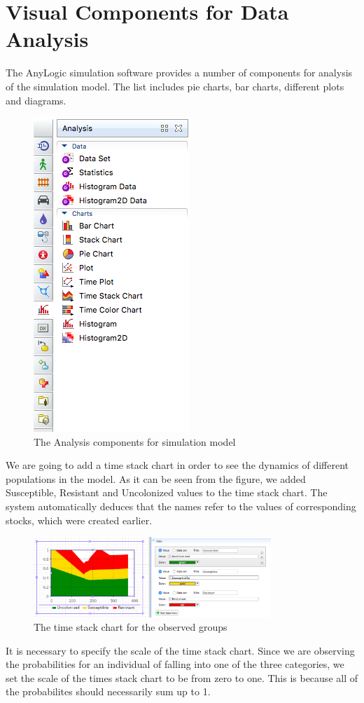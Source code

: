 \section{Visual Components for Data Analysis}

The AnyLogic simulation software provides a number of components for analysis of the simulation model. The list includes pie charts, bar charts, different plots and diagrams.

\begin{figure}[H]
  \centering
  \includegraphics[height=0.5\textwidth]{img/screens/charts/charts1}
  \caption{The Analysis components for simulation model}
\end{figure}

We are going to add a time stack chart in order to see the dynamics of different populations in the model. As it can be seen from the figure, we added Susceptible, Resistant and Uncolonized values to the time stack chart. The system automatically deduces that the names refer to the values of corresponding stocks, which were created earlier.

\begin{figure}[H]
  \centering
  \includegraphics[width=0.8\textwidth]{img/screens/charts/charts5}
  \caption{The time stack chart for the observed groups}
\end{figure}

It is necessary to specify the scale of the time stack chart. Since we are observing the probabilities for an individual of falling into one of the three categories, we set the scale of the times stack chart to be from zero to one. This is because all of the probabilites should necessarily sum up to 1.

